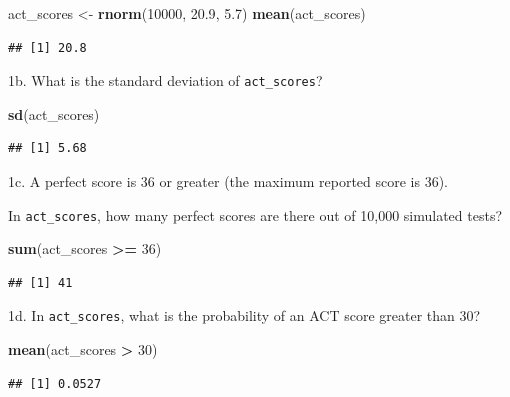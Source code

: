 \documentclass[
]{article}
\newenvironment{Shaded}{\begin{snugshade}}{\end{snugshade}}
\newcommand{\DecValTok}[1]{\textcolor[rgb]{0.00,0.00,0.81}{#1}}
\newcommand{\FloatTok}[1]{\textcolor[rgb]{0.00,0.00,0.81}{#1}}
\newcommand{\KeywordTok}[1]{\textcolor[rgb]{0.13,0.29,0.53}{\textbf{#1}}}
\newcommand{\NormalTok}[1]{#1}
\newcommand{\OperatorTok}[1]{\textcolor[rgb]{0.81,0.36,0.00}{\textbf{#1}}}
\newcommand{\StringTok}[1]{\textcolor[rgb]{0.31,0.60,0.02}{#1}}
\begin{document}
\begin{Shaded}
\begin{Highlighting}[]
\NormalTok{act\_scores \textless{}{-}}\StringTok{ }\KeywordTok{rnorm}\NormalTok{(}\DecValTok{10000}\NormalTok{, }\FloatTok{20.9}\NormalTok{, }\FloatTok{5.7}\NormalTok{)}
\KeywordTok{mean}\NormalTok{(act\_scores)}
\end{Highlighting}
\end{Shaded}

\begin{verbatim}
## [1] 20.8
\end{verbatim}

1b. What is the standard deviation of \texttt{act\_scores}?

\begin{Shaded}
\begin{Highlighting}[]
\KeywordTok{sd}\NormalTok{(act\_scores)}
\end{Highlighting}
\end{Shaded}

\begin{verbatim}
## [1] 5.68
\end{verbatim}

1c. A perfect score is 36 or greater (the maximum reported score is 36).

In \texttt{act\_scores}, how many perfect scores are there out of 10,000
simulated tests?

\begin{Shaded}
\begin{Highlighting}[]
\KeywordTok{sum}\NormalTok{(act\_scores }\OperatorTok{\textgreater{}=}\StringTok{ }\DecValTok{36}\NormalTok{)}
\end{Highlighting}
\end{Shaded}

\begin{verbatim}
## [1] 41
\end{verbatim}

1d. In \texttt{act\_scores}, what is the probability of an ACT score
greater than 30?

\begin{Shaded}
\begin{Highlighting}[]
\KeywordTok{mean}\NormalTok{(act\_scores }\OperatorTok{\textgreater{}}\StringTok{ }\DecValTok{30}\NormalTok{)}
\end{Highlighting}
\end{Shaded}

\begin{verbatim}
## [1] 0.0527
\end{verbatim}
\end{document}
